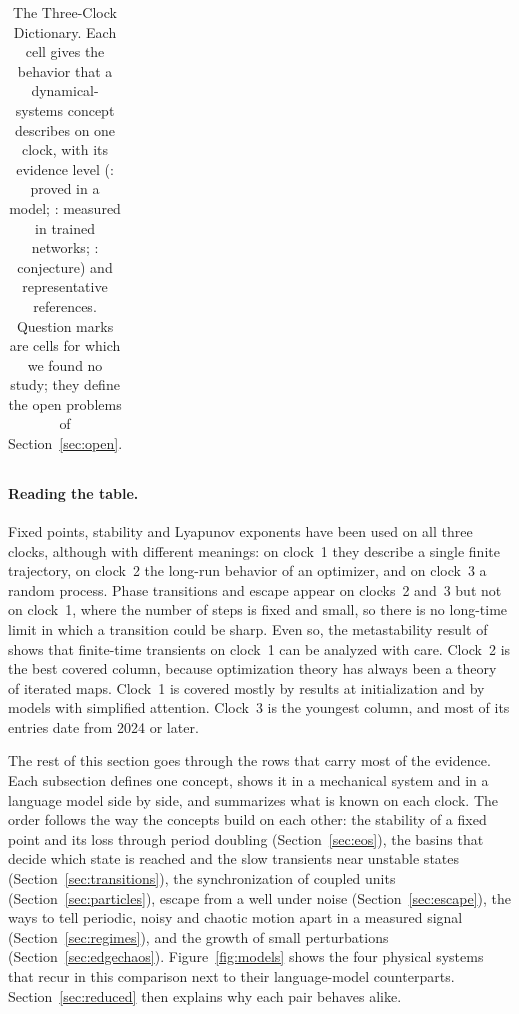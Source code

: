 \begin{table}[p]
\begin{tabularx}{\textwidth}{>{\raggedright\arraybackslash}p{2.1cm} >{\raggedright\arraybackslash}X >{\raggedright\arraybackslash}X >{\raggedright\arraybackslash}X}
\bottomrule
\end{tabularx}
\caption{The Three-Clock Dictionary. Each cell gives the behavior that a dynamical-systems concept describes on one clock, with its evidence level (\statusP: proved in a model; \statusM: measured in trained networks; \statusC: conjecture) and representative references. Question marks are cells for which we found no study; they define the open problems of Section~\ref{sec:open}.}
\label{tab:dictionary}
\end{table}

\paragraph{Reading the table.} Fixed points, stability and Lyapunov exponents have been used on all three clocks, although with different meanings: on clock~1 they describe a single finite trajectory, on clock~2 the long-run behavior of an optimizer, and on clock~3 a random process. Phase transitions and escape appear on clocks~2 and~3 but not on clock~1, where the number of steps is fixed and small, so there is no long-time limit in which a transition could be sharp. Even so, the metastability result of \citet{geshkovski2024dynamic} shows that finite-time transients on clock~1 can be analyzed with care. Clock~2 is the best covered column, because optimization theory has always been a theory of iterated maps. Clock~1 is covered mostly by results at initialization and by models with simplified attention. Clock~3 is the youngest column, and most of its entries date from 2024 or later.

The rest of this section goes through the rows that carry most of the evidence. Each subsection defines one concept, shows it in a mechanical system and in a language model side by side, and summarizes what is known on each clock. The order follows the way the concepts build on each other: the stability of a fixed point and its loss through period doubling (Section~\ref{sec:eos}), the basins that decide which state is reached and the slow transients near unstable states (Section~\ref{sec:transitions}), the synchronization of coupled units (Section~\ref{sec:particles}), escape from a well under noise (Section~\ref{sec:escape}), the ways to tell periodic, noisy and chaotic motion apart in a measured signal (Section~\ref{sec:regimes}), and the growth of small perturbations (Section~\ref{sec:edgechaos}). Figure~\ref{fig:models} shows the four physical systems that recur in this comparison next to their language-model counterparts. Section~\ref{sec:reduced} then explains why each pair behaves alike.

